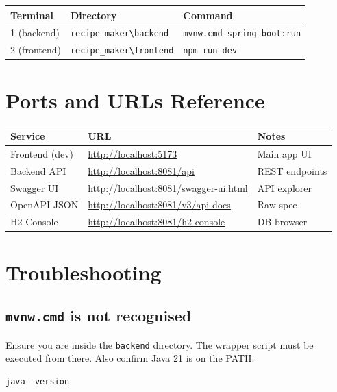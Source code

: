 \documentclass[12pt,a4paper]{article}
\begin{document}
\begin{center}
\begin{tabular}{lll}
\toprule
\textbf{Terminal} & \textbf{Directory} & \textbf{Command} \\
\midrule
1 (backend)  & \texttt{recipe\_maker\textbackslash backend}  & \texttt{mvnw.cmd spring-boot:run} \\
2 (frontend) & \texttt{recipe\_maker\textbackslash frontend} & \texttt{npm run dev} \\
\bottomrule
\end{tabular}
\end{center}

\section{Ports and URLs Reference}

\begin{center}
\begin{tabular}{lll}
\toprule
\textbf{Service} & \textbf{URL} & \textbf{Notes} \\
\midrule
Frontend (dev)   & \url{http://localhost:5173}              & Main app UI \\
Backend API      & \url{http://localhost:8081/api}          & REST endpoints \\
Swagger UI       & \url{http://localhost:8081/swagger-ui.html} & API explorer \\
OpenAPI JSON     & \url{http://localhost:8081/v3/api-docs}  & Raw spec \\
H2 Console       & \url{http://localhost:8081/h2-console}   & DB browser \\
\bottomrule
\end{tabular}
\end{center}

\section{Troubleshooting}

\subsection{\texttt{mvnw.cmd} is not recognised}
Ensure you are inside the \texttt{backend} directory.  The wrapper script
must be executed from there.  Also confirm Java 21 is on the PATH:
\begin{lstlisting}
java -version
\end{lstlisting}
\end{document}
